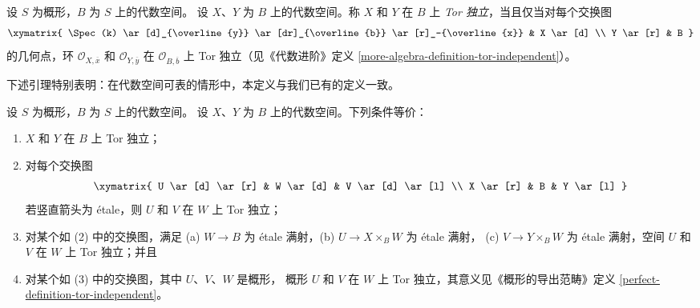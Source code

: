 \begin{definition}
\label{definition-tor-independent}
设 $S$ 为概形，$B$ 为 $S$ 上的代数空间。
设 $X$、$Y$ 为 $B$ 上的代数空间。称 $X$ 和
$Y$ 在 $B$ 上 {\it Tor 独立}，当且仅当对每个交换图
$$
\xymatrix{
\Spec(k) \ar[d]_{\overline{y}} \ar[dr]_{\overline{b}} \ar[r]_-{\overline{x}} &
X \ar[d] \\
Y \ar[r] & B
}
$$
的几何点，环 $\mathcal{O}_{X, \overline{x}}$ 和
$\mathcal{O}_{Y, \overline{y}}$ 在
$\mathcal{O}_{B, \overline{b}}$ 上 Tor 独立（见《代数进阶》定义
\ref{more-algebra-definition-tor-independent}）。
\end{definition}

\noindent
下述引理特别表明：在代数空间可表的情形中，本定义与我们已有的定义一致。

\begin{lemma}
\label{lemma-tor-independent}
设 $S$ 为概形，$B$ 为 $S$ 上的代数空间。
设 $X$、$Y$ 为 $B$ 上的代数空间。下列条件等价：
\begin{enumerate}
\item $X$ 和 $Y$ 在 $B$ 上 Tor 独立；
\item 对每个交换图
$$
\xymatrix{
U \ar[d] \ar[r] & W \ar[d] & V \ar[d] \ar[l] \\
X \ar[r] & B & Y \ar[l]
}
$$
若竖直箭头为 \'etale，则 $U$ 和 $V$ 在 $W$ 上 Tor 独立；%
\item 对某个如 (2) 中的交换图，满足 (a) $W \to B$ 为
\'etale 满射，(b) $U \to X \times_B W$ 为 \'etale 满射，
(c) $V \to Y \times_B W$ 为 \'etale 满射，空间 $U$ 和 $V$
在 $W$ 上 Tor 独立；并且
\item 对某个如 (3) 中的交换图，其中 $U$、$V$、$W$ 是概形，
概形 $U$ 和 $V$ 在 $W$ 上 Tor 独立，其意义见《概形的导出范畴》定义
\ref{perfect-definition-tor-independent}。
\end{enumerate}
\end{lemma}

